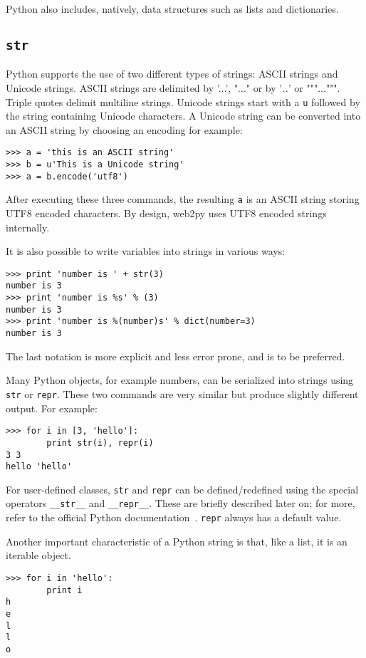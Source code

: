 \documentclass[justified,sixbynine,notoc]{tufte-book}
\def\ft{\small\tt}
\def\inxx#1{\index{#1}}
\begin{document}
\begin{fullwidth}
Python also includes, natively, data structures such as lists and dictionaries.

\goodbreak\subsection{{\ft str}}

\inxx{str} \inxx{ASCII} \inxx{UTF8} \inxx{Unicode} \inxx{encode}

Python supports the use of two different types of strings: ASCII strings and Unicode strings. ASCII strings are delimited by '...', "..." or by '{\it..}' or """...""". Triple quotes delimit multiline strings. Unicode strings start with a {\ft u} followed by the string containing Unicode characters. A Unicode string can be converted into an ASCII string by choosing an encoding for example:
\begin{lstlisting}
>>> a = 'this is an ASCII string'
>>> b = u'This is a Unicode string'
>>> a = b.encode('utf8')
\end{lstlisting}

After executing these three commands, the resulting {\ft a} is an ASCII string storing UTF8 encoded characters. By design, web2py uses UTF8 encoded strings internally.

It is also possible to write variables into strings in various ways:
\begin{lstlisting}
>>> print 'number is ' + str(3)
number is 3
>>> print 'number is %s' % (3)
number is 3
>>> print 'number is %(number)s' % dict(number=3)
number is 3
\end{lstlisting}

The last notation is more explicit and less error prone, and is to be preferred.

Many Python objects, for example numbers, can be serialized into strings using {\ft str} or {\ft repr}. These two commands are very similar but produce slightly different output. For example:
\begin{lstlisting}
>>> for i in [3, 'hello']:
        print str(i), repr(i)
3 3
hello 'hello'
\end{lstlisting}

For user-defined classes, {\ft str} and {\ft repr} can be defined/redefined using the special operators {\ft \_\_str\_\_} and {\ft \_\_repr\_\_}. These are briefly described later on; for more, refer to the official Python documentation~\cite{pydocs}. {\ft repr} always has a default value.

Another important characteristic of a Python string is that, like a list, it is an iterable object.
\begin{lstlisting}
>>> for i in 'hello':
        print i
h
e
l
l
o
\end{lstlisting}


\end{fullwidth}
\end{document}
